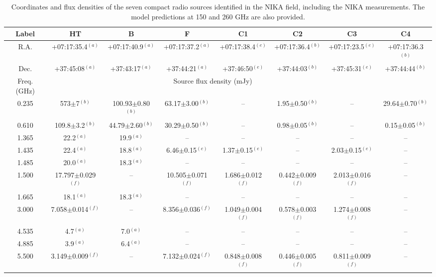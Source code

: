 \documentclass[twocolumn,traditabstract]{aa}
\begin{document}
\begin{table}[h]
\caption{\footnotesize{Coordinates and flux densities of the seven compact radio sources identified in the NIKA field, including the NIKA measurements. The model predictions at 150 and 260 GHz are also provided.}}
\begin{center}
\begin{tabular}{c|ccccccc}
\hline
\hline
Label & HT & B & F & C1 & C2 & C3 & C4 \\
\hline
\hline
R.A. & +07:17:35.4$^{(a)}$ & +07:17:40.9$^{(a)}$ & +07:17:37.2$^{(a)}$ & +07:17:38.4$^{(e)}$ & +07:17:36.4$^{(b)}$ & +07:17:23.5$^{(e)}$ & +07:17:36.3$^{(b)}$ \\
Dec. & +37:45:08$^{(a)}$ & +37:43:17$^{(a)}$ & +37:44:21$^{(a)}$ & +37:46:50$^{(e)}$ & +37:44:03$^{(b)}$ & +37:45:31$^{(e)}$ & +37:44:44$^{(b)}$ \\
\hline
\hline
Freq. (GHz) & \multicolumn{6}{c}{Source flux density (mJy)} \\
 \hline
0.235 & 573$\pm$7$^{(b)}$ & 100.93$\pm$0.80$^{(b)}$ & 63.17$\pm$3.00$^{(b)}$ &  --  & 1.95$\pm$0.50$^{(b)}$ &  --  & 29.64$\pm$0.70$^{(b)}$ \\
0.610 & 109.8$\pm$3.2$^{(b)}$ & 44.79$\pm$2.60$^{(b)}$ & 30.29$\pm$0.50$^{(b)}$ &  --  & 0.98$\pm$0.05$^{(b)}$ &  --  & 0.15$\pm$0.05$^{(b)}$ \\
1.365 & 22.2$^{(a)}$ & 19.9$^{(a)}$ &  --  &  --  &  --  &  --  &  --  \\
1.435 & 22.4$^{(a)}$ & 18.8$^{(a)}$ & 6.46$\pm$0.15$^{(e)}$ & 1.37$\pm$0.15$^{(e)}$ &  --  & 2.03$\pm$0.15$^{(e)}$ &  --  \\
1.485 & 20.0$^{(a)}$ & 18.3$^{(a)}$ &  --  &  --  &  --  &  --  &  --  \\
1.500 & 17.797$\pm$0.029$^{(f)}$ &  --  & 10.505$\pm$0.071$^{(f)}$ & 1.686$\pm$0.012$^{(f)}$ & 0.442$\pm$0.009$^{(f)}$ & 2.013$\pm$0.016$^{(f)}$ &  --  \\
1.665 & 18.1$^{(a)}$ & 18.3$^{(a)}$ &  --  &  --  &  --  &  --  &  --  \\
3.000 & 7.058$\pm$0.014$^{(f)}$ &  --  & 8.356$\pm$0.036$^{(f)}$ & 1.049$\pm$0.004$^{(f)}$ & 0.578$\pm$0.003$^{(f)}$ & 1.274$\pm$0.008$^{(f)}$ &  --  \\
4.535 & 4.7$^{(a)}$ & 7.0$^{(a)}$ &  --  &  --  &  --  &  --  &  --  \\
4.885 & 3.9$^{(a)}$ & 6.4$^{(a)}$ &  --  &  --  &  --  &  --  &  --  \\
5.500 & 3.149$\pm$0.009$^{(f)}$ &  --  & 7.132$\pm$0.024$^{(f)}$ & 0.848$\pm$0.008$^{(f)}$ & 0.446$\pm$0.005$^{(f)}$ & 0.811$\pm$0.009$^{(f)}$ &  --  \\

\end{tabular}
\end{center}
\end{table}
\end{document}
